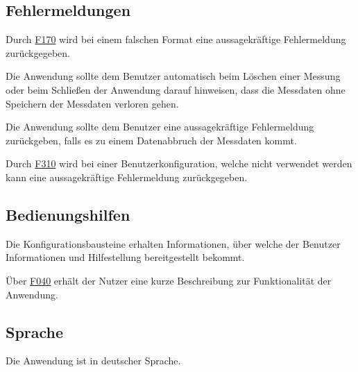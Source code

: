 \documentclass[parskip=full]{scrartcl}
\begin{document}
\subsection{Fehlermeldungen}

\begin{description}
\hypertarget{link-f430}{\item[F430]} Durch \hyperlink{link-f170}{F170} wird bei einem falschen Format eine aussagekräftige Fehlermeldung zurückgegeben.
\hypertarget{link-f440}{\item[F440]} Die Anwendung sollte dem Benutzer automatisch beim Löschen einer Messung oder beim Schließen der Anwendung darauf hinweisen, dass die Messdaten ohne Speichern der Messdaten verloren gehen.
\hypertarget{link-f450}{\item[F450]} Die Anwendung sollte dem Benutzer eine aussagekräftige Fehlermeldung zurückgeben, falls es zu einem Datenabbruch der Messdaten kommt.
\hypertarget{link-f460}{\item[F460]} Durch \hyperlink{link-f310}{F310} wird bei einer \gls{Benutzerkonfiguration}, welche nicht verwendet werden kann eine aussagekräftige Fehlermeldung zurückgegeben.

\end{description}

\subsection{Bedienungshilfen}

\begin{description}

\hypertarget{link-f470}{\item[F470]} Die Konfigurationsbausteine erhalten Informationen, über welche der Benutzer Informationen und Hilfestellung bereitgestellt bekommt.
\hypertarget{link-f480}{\item[F480]} Über \hyperlink{link-f040}{F040} erhält der Nutzer eine kurze Beschreibung zur Funktionalität der Anwendung.

\end{description}

\subsection{Sprache}

\begin{description}

\hypertarget{link-f490}{\item[F490]} Die Anwendung ist in deutscher Sprache.

\end{description}
\end{document}

